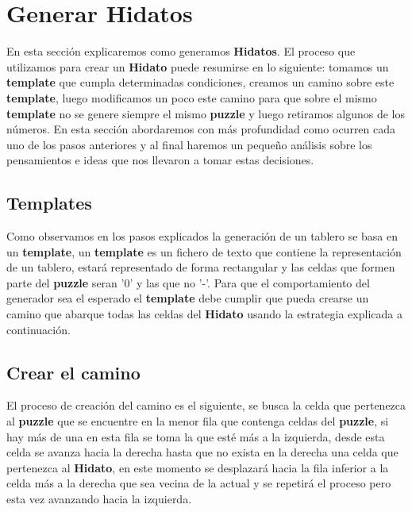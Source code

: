 \documentclass[12pt]{article}
\begin{document}
\section{Generar Hidatos}
En esta secci\'on explicaremos como generamos {\bf Hidatos}. El proceso que utilizamos para crear un {\bf Hidato} puede resumirse en lo siguiente: tomamos un {\bf template} que cumpla
determinadas condiciones, creamos un camino sobre este {\bf template}, luego modificamos un poco este camino para que sobre el mismo {\bf template} no se genere siempre el mismo {\bf puzzle} y luego retiramos
algunos de los n\'umeros. En esta secci\'on abordaremos con m\'as profundidad como ocurren cada uno de los pasos anteriores y al final haremos un peque\~no an\'alisis sobre los pensamientos e ideas que nos llevaron 
a tomar estas decisiones.
\subsection{Templates}
Como observamos en los pasos explicados la generaci\'on de un tablero se basa en un {\bf template}, un {\bf template} es un fichero de texto que contiene la representaci\'on de un tablero, estar\'a representado de forma 
rectangular y las celdas que formen parte del {\bf puzzle} seran '0' y las que no '-'. Para que el comportamiento del generador sea el esperado el {\bf template} debe cumplir que pueda crearse un camino que abarque todas las 
celdas del {\bf Hidato} usando la estrategia explicada a continuaci\'on.
\subsection{Crear el camino}
El proceso de creaci\'on del camino es el siguiente, se busca la celda que pertenezca al {\bf puzzle} que se encuentre en la menor fila que contenga celdas del {\bf puzzle}, si hay m\'as de una en esta fila se toma la que 
est\'e m\'as a la izquierda, desde esta celda se avanza hacia la derecha hasta que no exista en la derecha una celda que pertenezca al {\bf Hidato}, en este momento se desplazar\'a hacia la fila inferior a la celda m\'as a la derecha
que sea vecina de la actual y se repetir\'a el proceso pero esta vez avanzando hacia la izquierda.
\end{document}
